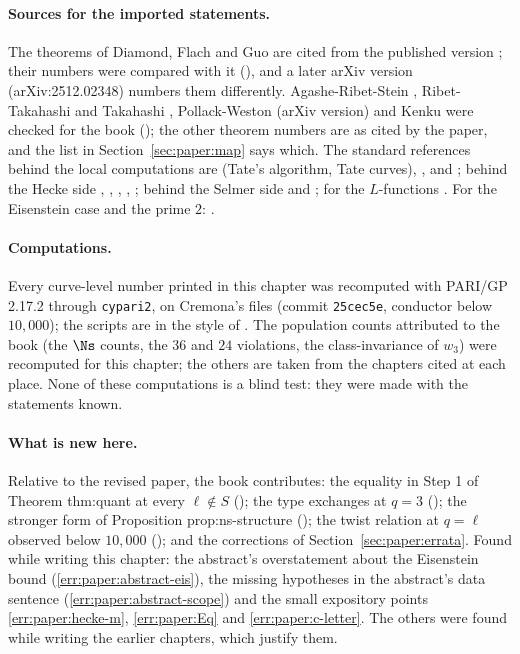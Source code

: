 \begin{sloppypar}
\paragraph{Sources for the imported statements.} The theorems of Diamond, Flach and Guo are cited from the published version \cite{DFG04}; their numbers were compared with it (),
and a later arXiv version (arXiv:2512.02348) numbers them differently. Agashe-Ribet-Stein \cite{ARS12}, Ribet-Takahashi \cite{RibetTakahashi97} and Takahashi \cite{Takahashi01}, Pollack-Weston
\cite{PollackWeston11} (arXiv version) and Kenku \cite{Kenku} were checked for the book (); the other theorem numbers are as cited by the paper, and the list in
Section~\ref{sec:paper:map} says which. The standard references behind the local computations are \cite{SilvermanATAEC} (Tate's algorithm, Tate curves), \cite{SerreTate68}, \cite{Kraus90} and \cite{Tate75};
behind the Hecke side \cite{DDT}, \cite{AtkinLehner70}, \cite{AtkinLi78}, \cite{Ribet83}, \cite{AU96}; behind the Selmer side \cite{FPR94} and \cite{BlochKato}; for the $L$-functions \cite{Shimura75,Shimura76,Rankin39}.
For the Eisenstein case and the prime $2$: \cite{Mazur77,Watkins02,CalegariEmerton09}.

\paragraph{Computations.} Every curve-level number printed in this chapter was recomputed with PARI/GP \cite{PARI} 2.17.2 through \texttt{cypari2}, on Cremona's files \cite{ecdata} (commit \texttt{25cec5e},
conductor below $10{,}000$); the scripts are in the style of . The population counts attributed to the book (the $\Ns$ counts, the $36$ and $24$ violations, the class-invariance
of $w_3$) were recomputed for this chapter; the others are taken from the chapters cited at each place. None of these computations is a blind test: they were made with the statements known.

\paragraph{What is new here.} Relative to the revised paper, the book contributes: the equality in Step 1 of Theorem thm:quant at every $\ell\notin S$ (); the type exchanges at $q=3$
(); the stronger form of Proposition prop:ns-structure (); the twist relation at $q=\ell$ observed below $10{,}000$ (); and the corrections of
Section~\ref{sec:paper:errata}. Found while writing this chapter: the abstract's overstatement about the Eisenstein bound (\ref{err:paper:abstract-eis}), the missing hypotheses in the abstract's data
sentence (\ref{err:paper:abstract-scope}) and the small expository
points \ref{err:paper:hecke-m}, \ref{err:paper:Eq} and \ref{err:paper:c-letter}. The others were found while writing the earlier chapters, which justify them.
\end{sloppypar}
